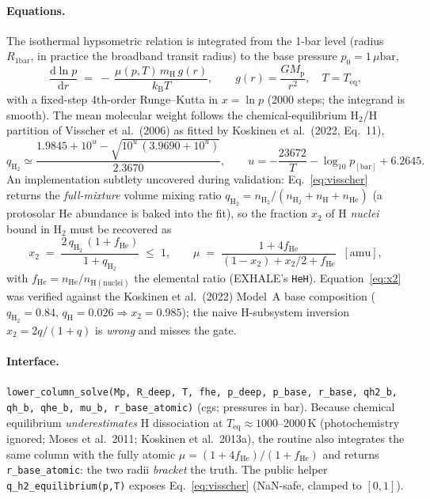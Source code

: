 \documentclass[english,a4paper]{my_memo}
\newcommand{\ubar}{\mu\mathrm{bar}}
\newcommand{\qHH}{q_{\mathrm{H_2}}}
\begin{document}
\paragraph{Equations.} The isothermal hypsometric relation is integrated from the 1-bar
level (radius $R_\mathrm{1bar}$, in practice the broadband transit radius) to the base
pressure $p_0=1\,\ubar$,
\begin{equation}
  \frac{\mathrm{d}\ln p}{\mathrm{d}r} \;=\; -\,\frac{\mu(p,T)\,m_\mathrm{H}\,g(r)}{k_\mathrm{B}T},
  \qquad g(r)=\frac{GM_\mathrm{p}}{r^{2}},\quad T=T_\mathrm{eq},
  \label{eq:hypso}
\end{equation}
with a fixed-step 4th-order Runge--Kutta in $x=\ln p$ (2000 steps; the integrand is
smooth). The mean molecular weight follows the chemical-equilibrium H$_2$/H partition of
Visscher et al.\ (2006) as fitted by Koskinen et al.\ (2022, Eq.~11),
\begin{equation}
  \qHH \simeq \frac{1.9845 + 10^{u} - \sqrt{10^{u}\,(3.9690 + 10^{u})}}{2.3670},
  \qquad u = -\frac{23672}{T} - \log_{10} p_\mathrm{[bar]} + 6.2645 .
  \label{eq:visscher}
\end{equation}
An implementation subtlety uncovered during validation: Eq.~\eqref{eq:visscher} returns
the \emph{full-mixture} volume mixing ratio $\qHH = n_\mathrm{H_2}/(n_\mathrm{H_2}+
n_\mathrm{H}+n_\mathrm{He})$ (a protosolar He abundance is baked into the fit), so the
fraction $x_2$ of H \emph{nuclei} bound in H$_2$ must be recovered as
\begin{equation}
  x_2 \;=\; \frac{2\,\qHH\,(1+f_\mathrm{He})}{1+\qHH}\;\le\;1,
  \qquad
  \mu \;=\; \frac{1+4f_\mathrm{He}}{(1-x_2)+x_2/2+f_\mathrm{He}}\;\;[\mathrm{amu}],
  \label{eq:x2}
\end{equation}
with $f_\mathrm{He}=n_\mathrm{He}/n_\mathrm{H(nuclei)}$ the elemental ratio (EXHALE's
\texttt{HeH}). Equation~\eqref{eq:x2} was verified against the Koskinen et al.\ (2022)
Model~A base composition ($\qHH=0.84$, $q_\mathrm{H}=0.026 \Rightarrow x_2=0.985$); the
naive H-subsystem inversion $x_2=2q/(1+q)$ is \emph{wrong} and misses the gate.

\paragraph{Interface.} \texttt{lower\_column\_solve(Mp, R\_deep, T, fhe, p\_deep, p\_base,
r\_base, qh2\_b, qh\_b, qhe\_b, mu\_b, r\_base\_atomic)} (cgs; pressures in bar). Because
chemical equilibrium \emph{underestimates} H dissociation at
$T_\mathrm{eq}\approx1000$--2000\,K (photochemistry ignored; Moses et al.\ 2011; Koskinen
et al.\ 2013a), the routine also integrates the same column with the fully atomic
$\mu=(1+4f_\mathrm{He})/(1+f_\mathrm{He})$ and returns \texttt{r\_base\_atomic}: the two
radii \emph{bracket} the truth. The public helper \texttt{q\_h2\_equilibrium(p,T)} exposes
Eq.~\eqref{eq:visscher} (NaN-safe, clamped to $[0,1]$).
\end{document}
